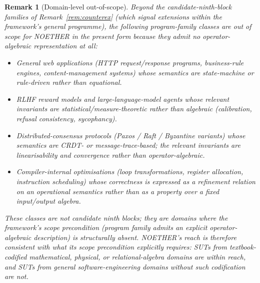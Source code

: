 \documentclass[manuscript]{acmart}
\newtheorem{remark}{Remark}
\begin{document}
\begin{remark}[Domain-level out-of-scope]
\label{rem:domain-out-of-scope}
Beyond the candidate-ninth-block families of Remark~\ref{rem:counterex} (which signal extensions \emph{within} the framework's general programme), the following program-family classes are out of scope for NOETHER in the present form because they admit no operator-algebraic representation at all:
\begin{itemize}
    \item \emph{General web applications} (HTTP request/response programs, business-rule engines, content-management systems) whose semantics are state-machine or rule-driven rather than equational.
    \item \emph{RLHF reward models and large-language-model agents} whose relevant invariants are statistical/measure-theoretic rather than algebraic (calibration, refusal consistency, sycophancy).
    \item \emph{Distributed-consensus protocols} (Paxos / Raft / Byzantine variants) whose semantics are CRDT- or message-trace-based; the relevant invariants are linearisability and convergence rather than operator-algebraic.
    \item \emph{Compiler-internal optimisations} (loop transformations, register allocation, instruction scheduling) whose correctness is expressed as a refinement relation on an operational semantics rather than as a property over a fixed input/output algebra.
\end{itemize}
These classes are not candidate ninth blocks; they are domains where the framework's scope precondition (program family admits an explicit operator-algebraic description) is structurally absent. NOETHER's reach is therefore consistent with what its scope precondition explicitly requires: SUTs from textbook-codified mathematical, physical, or relational-algebra domains are within reach, and SUTs from general software-engineering domains without such codification are not.
\end{remark}
\end{document}

